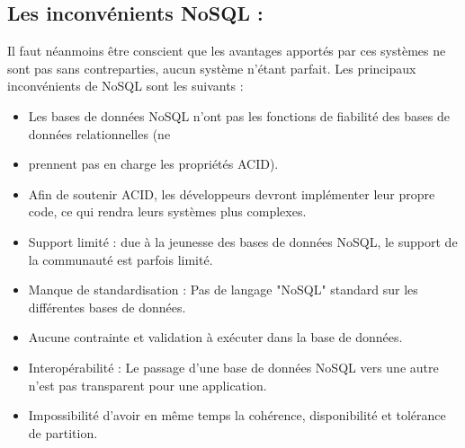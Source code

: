 \subsection{Les inconvénients NoSQL : }
Il faut néanmoins être conscient que les avantages apportés par ces systèmes ne sont
pas sans contreparties, aucun système n'étant parfait. Les principaux inconvénients de
NoSQL sont les suivants :

\begin{itemize}
\item Les bases de données NoSQL n'ont pas les fonctions de fiabilité des bases de données relationnelles (ne \item prennent pas en charge les propriétés ACID).
\item Afin de soutenir ACID, les développeurs devront implémenter leur propre code, ce qui rendra leurs systèmes plus complexes.
\item Support limité : due à la jeunesse des bases de données NoSQL, le support de la communauté est parfois limité.
\item Manque de standardisation : Pas de langage "NoSQL" standard sur les différentes bases de données.
\item Aucune contrainte et validation à exécuter dans la base de données.
\item Interopérabilité : Le passage d'une base de données NoSQL vers une autre n'est pas transparent pour une application.
\item Impossibilité d'avoir en même temps la cohérence, disponibilité et tolérance de partition.

\end{itemize}